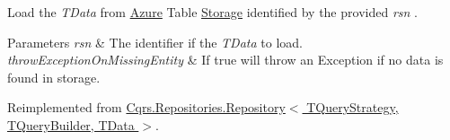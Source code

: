 Load the {\itshape T\+Data}  from \hyperlink{namespaceCqrs_1_1Azure}{Azure} Table \hyperlink{namespaceCqrs_1_1Azure_1_1Storage}{Storage} identified by the provided {\itshape rsn} . 


\begin{DoxyParams}{Parameters}
{\em rsn} & The identifier if the {\itshape T\+Data}  to load.\\
\hline
{\em throw\+Exception\+On\+Missing\+Entity} & If true will throw an Exception if no data is found in storage.\\
\hline
\end{DoxyParams}


Reimplemented from \hyperlink{classCqrs_1_1Repositories_1_1Repository_a444e9dfe4710be90940dbb6dec9d856f_a444e9dfe4710be90940dbb6dec9d856f}{Cqrs.\+Repositories.\+Repository$<$ T\+Query\+Strategy, T\+Query\+Builder, T\+Data $>$}.

